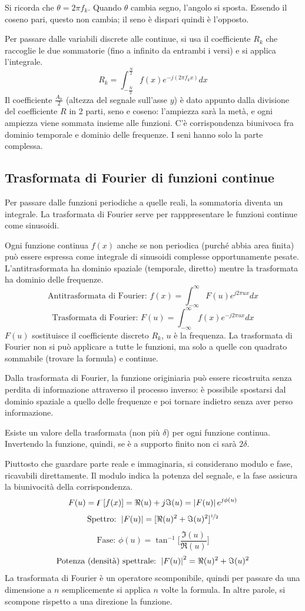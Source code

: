Si ricorda che $\theta = 2\pi f_k$. Quando $\theta$ cambia segno, l'angolo si sposta. Essendo il coseno pari, questo non cambia; il seno è dispari quindi è l'opposto. 

Per passare dalle variabili discrete alle continue, si usa il coefficiente $R_k$ che raccoglie le due sommatorie (fino a infinito da entrambi i versi) e si applica l'integrale. 
$$R_k = \int_{-\frac{N}{2}}^{\frac{N}{2}} f(x)e^{-j(2\pi f_kx)} dx$$
Il coefficiente $\frac{A_n}{2}$ (altezza del segnale sull'asse $y$) è dato appunto dalla divisione del coefficiente $R$ in 2 parti, seno e coseno: l'ampiezza sarà la metà, e ogni ampiezza viene sommata insieme alle funzioni. C'è corrispondenza biunivoca fra dominio temporale e dominio delle frequenze. I seni hanno solo la parte complessa.

\subsection{Trasformata di Fourier di funzioni continue}
Per passare dalle funzioni periodiche a quelle reali, la sommatoria diventa un integrale. La trasformata di Fourier serve per rapppresentare le funzioni continue come sinusoidi.

Ogni funzione continua $f(x)$ anche se non periodica (purché abbia area finita) può essere espressa come integrale di sinusoidi complesse opportunamente pesate. L'antitrasformata ha dominio spaziale (temporale, diretto) mentre la trasformata ha dominio delle frequenze.
$$\text{Antitrasformata di Fourier: } f(x) = \int_{-\infty}^{\infty} F(u)e^{j2\pi ux} dx$$
$$\text{Trasformata di Fourier: } F(u) = \int_{-\infty}^{\infty} f(x)e^{-j2\pi ux} dx$$
$F(u)$ sostituisce il coefficiente discreto $R_k$, $u$ è la frequenza. La trasformata di Fourier non si può applicare a tutte le funzioni, ma solo a quelle con quadrato sommabile (trovare la formula) e continue.

Dalla trasformata di Fourier, la funzione originiaria può essere ricostruita senza perdita di informazione attraverso il processo inverso: è possibile spostarsi dal dominio spaziale a quello delle frequenze e poi tornare indietro senza aver perso informazione.

Esiste un valore della trasformata (non più $\delta$) per ogni funzione continua. Invertendo la funzione, quindi, se è a supporto finito non ci sarà $2\delta$.

Piuttosto che guardare parte reale e immaginaria, si considerano modulo e fase, ricavabili direttamente. Il modulo indica la potenza del segnale, e la fase assicura la biunivocità della corrispondenza. 
$$F(u) = \digamma[f(x)] = \Re(u) + j\Im(u) = \left|F(u)\right|e^{j\phi(u)}$$
$$\text{Spettro: } \left|F(u)\right| = [\Re(u)^2 + \Im(u)^2]^{\nicefrac{1}{2}}$$
$$\text{Fase: } \phi(u) = \tan^{-1} \Big[\frac{\Im(u)}{\Re(u)}\Big]$$
$$\text{Potenza (densità) spettrale: } \left|F(u)\right|^2 = \Re(u)^2 + \Im(u)^2$$
La trasformata di Fourier è un operatore scomponibile, quindi per passare da una dimensione a $n$ semplicemente si applica $n$ volte la formula. In altre parole, si scompone rispetto a una direzione la funzione.

